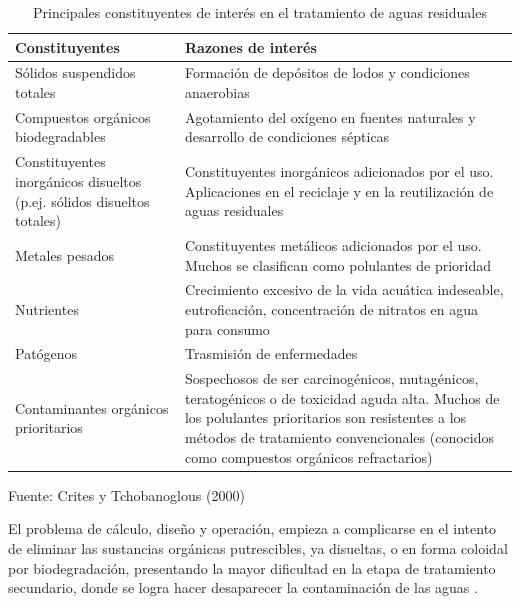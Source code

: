 	\begin{table}[!ht]
	\caption{Principales constituyentes de interés en el tratamiento de aguas residuales}\label{tab:constituyentes}
	\begin{center}
		\begin{tiny}
		\begin{tabular}{ | m{5cm} | m{10cm} | }
		\hline
		\rowcolor{blanc}
		{\textbf{Constituyentes}} & {\textbf{Razones de interés}}\\ 
		\hline 
		Sólidos suspendidos totales & Formación de depósitos de lodos y condiciones anaerobias\par \\ 
		
		Compuestos orgánicos biodegradables & Agotamiento del oxígeno en fuentes naturales y desarrollo de condiciones sépticas\par \\
		
		Constituyentes inorgánicos disueltos (p.ej. sólidos disueltos totales) & Constituyentes inorgánicos adicionados por el uso. Aplicaciones en el reciclaje y en la reutilización de aguas residuales\par \\
		
		Metales pesados & Constituyentes metálicos adicionados por el uso. Muchos se clasifican como polulantes de prioridad\par \\
		
		Nutrientes & Crecimiento excesivo de la vida acuática indeseable, eutroficación, concentración de nitratos en agua para consumo\par \\
		
		Patógenos & Trasmisión de enfermedades\par \\
		
		Contaminantes orgánicos prioritarios & Sospechosos de ser carcinogénicos, mutagénicos, teratogénicos o de toxicidad aguda alta. Muchos de los polulantes prioritarios son resistentes a los métodos de tratamiento convencionales (conocidos como compuestos orgánicos refractarios)\\
		\hline
		\end{tabular}
		{\small{Fuente: Crites y Tchobanoglous (2000)}}
		\end{tiny}
	\end{center}
	\end{table}
El problema de cálculo, diseño y operación, empieza a complicarse en el intento de eliminar las sustancias orgánicas putrescibles, ya disueltas, o en forma coloidal por biodegradación, presentando la mayor dificultad en la etapa de tratamiento secundario, donde se logra hacer desaparecer la contaminación de las aguas \emph{\citep{ron}}.\\
